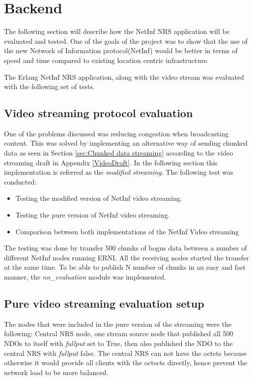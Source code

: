 \section{Backend}


The following section will describe how the NetInf NRS application will be evaluated and tested. One of the goals of the project was to show that the use of the new Network of Information protocol(NetInf) would be better in terms of speed and time compared to existing location centric infrastructure. 


The Erlang NetInf NRS application, along with the video stream was evaluated with the following set of tests. 

\subsection{Video streaming protocol evaluation}
One of the problems discussed was reducing congestion when broadcasting content. This was solved by implementing an alternative way of sending chunked data as seen in Section \ref{sec:Chunked data streaming} according to the video streaming draft in Appendix \ref{VideoDraft}. In the following section this implementation is referred as the \textit{modified streaming}. 
The following test was conducted:

\begin{itemize}
\item Testing the modified version of NetInf video streaming. 
\item Testing the pure version of NetInf video streaming.
\item Comparison between both implementations of the NetInf Video streaming
\end{itemize}

The testing was done by transfer 500 chunks of bogus data between a number of different NetInf nodes running ERNI. All the receiving nodes started the transfer at the same time. To be able to publish N number of chunks in an easy and fast manner, the \textit{nn\_evaluation} module was implemented.




\subsection{Pure video streaming evaluation setup}
The nodes that were included in the pure version of the streaming were the following:
Central NRS node, one stream source node that published all 500 NDOs to itself with \textit{fullput} set to True, then also published the NDO to the central NRS with \textit{fullput} false. The central NRS can not have the octets because otherwise it would provide all clients with the octects directly, hence prevent the network load to be more balanced.

